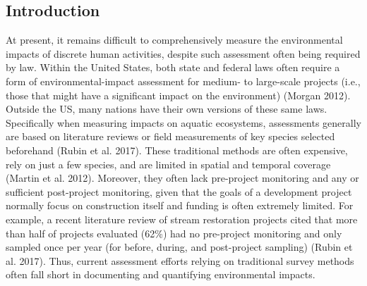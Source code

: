 \documentclass[
]{article}
\begin{document}
\newpage

\hypertarget{introduction}{%
\subsection{Introduction}\label{introduction}}

At present, it remains difficult to comprehensively measure the
environmental impacts of discrete human activities, despite such
assessment often being required by law. Within the United States, both
state and federal laws often require a form of environmental-impact
assessment for medium- to large-scale projects (i.e., those that might
have a significant impact on the environment) (Morgan 2012). Outside the
US, many nations have their own versions of these same laws.
Specifically when measuring impacts on aquatic ecosystems, assessments
generally are based on literature reviews or field measurements of key
species selected beforehand (Rubin et al. 2017). These traditional
methods are often expensive, rely on just a few species, and are limited
in spatial and temporal coverage (Martin et al. 2012). Moreover, they
often lack pre-project monitoring and any or sufficient post-project
monitoring, given that the goals of a development project normally focus
on construction itself and funding is often extremely limited. For
example, a recent literature review of stream restoration projects cited
that more than half of projects evaluated (62\%) had no pre-project
monitoring and only sampled once per year (for before, during, and
post-project sampling) (Rubin et al. 2017). Thus, current assessment
efforts relying on traditional survey methods often fall short in
documenting and quantifying environmental impacts.
\end{document}
